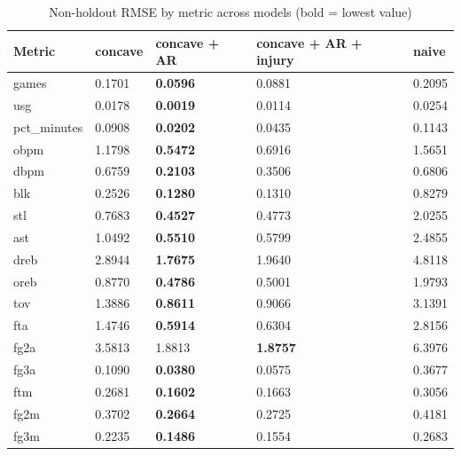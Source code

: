 \begin{table}
\caption{Non-holdout RMSE by metric across models (bold = lowest value)}
\label{tab:non_holdout_rmse_all_models}
\begin{tabular}{lllll}
\toprule
Metric & concave & concave + AR & concave + AR + injury & naive \\
\midrule
games & 0.1701 & \textbf{0.0596} & 0.0881 & 0.2095 \\
usg & 0.0178 & \textbf{0.0019} & 0.0114 & 0.0254 \\
pct_minutes & 0.0908 & \textbf{0.0202} & 0.0435 & 0.1143 \\
obpm & 1.1798 & \textbf{0.5472} & 0.6916 & 1.5651 \\
dbpm & 0.6759 & \textbf{0.2103} & 0.3506 & 0.6806 \\
blk & 0.2526 & \textbf{0.1280} & 0.1310 & 0.8279 \\
stl & 0.7683 & \textbf{0.4527} & 0.4773 & 2.0255 \\
ast & 1.0492 & \textbf{0.5510} & 0.5799 & 2.4855 \\
dreb & 2.8944 & \textbf{1.7675} & 1.9640 & 4.8118 \\
oreb & 0.8770 & \textbf{0.4786} & 0.5001 & 1.9793 \\
tov & 1.3886 & \textbf{0.8611} & 0.9066 & 3.1391 \\
fta & 1.4746 & \textbf{0.5914} & 0.6304 & 2.8156 \\
fg2a & 3.5813 & 1.8813 & \textbf{1.8757} & 6.3976 \\
fg3a & 0.1090 & \textbf{0.0380} & 0.0575 & 0.3677 \\
ftm & 0.2681 & \textbf{0.1602} & 0.1663 & 0.3056 \\
fg2m & 0.3702 & \textbf{0.2664} & 0.2725 & 0.4181 \\
fg3m & 0.2235 & \textbf{0.1486} & 0.1554 & 0.2683 \\
\bottomrule
\end{tabular}
\end{table}
